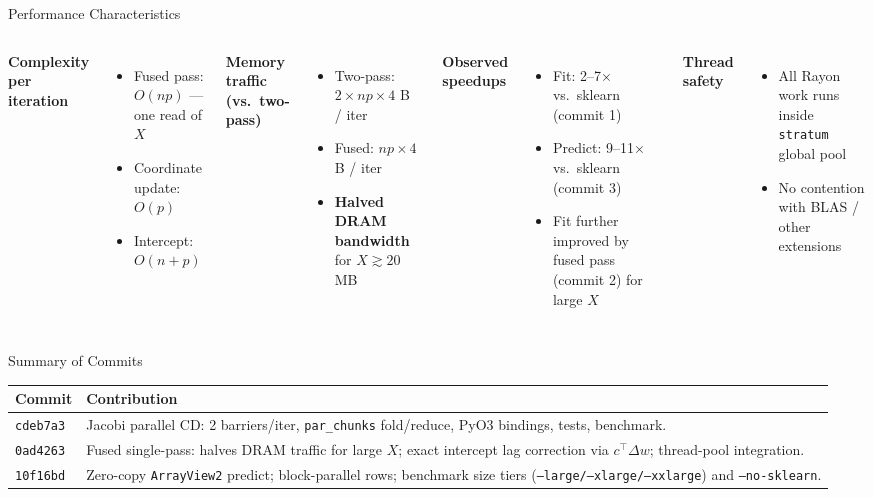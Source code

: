 \documentclass[aspectratio=169]{beamer}
\begin{document}
\begin{frame}{Performance Characteristics}
  \begin{columns}
    \textbf{Complexity per iteration}
    \begin{itemize}
      \item Fused pass: $O(np)$ — one read of $X$
      \item Coordinate update: $O(p)$
      \item Intercept: $O(n + p)$
    \end{itemize}
    \vspace{0.4em}
    \textbf{Memory traffic (vs.\ two-pass)}
    \begin{itemize}
      \item Two-pass: $2 \times np \times 4$ B / iter
      \item Fused: $np \times 4$ B / iter
      \item \textbf{Halved DRAM bandwidth} for $X \gtrsim 20$ MB
    \end{itemize}
    \textbf{Observed speedups}
    \begin{itemize}
      \item Fit: 2--7$\times$ vs.\ sklearn (commit 1)
      \item Predict: 9--11$\times$ vs.\ sklearn (commit 3)
      \item Fit further improved by fused pass (commit 2) for large $X$
    \end{itemize}
    \vspace{0.4em}
    \textbf{Thread safety}
    \begin{itemize}
      \item All Rayon work runs inside \texttt{stratum} global pool
      \item No contention with BLAS / other extensions
    \end{itemize}
  \end{columns}
\end{frame}


\begin{frame}{Summary of Commits}
  \begin{center}
  \begin{tabular}{lp{8.5cm}}
    \hline
    \textbf{Commit} & \textbf{Contribution} \\
    \hline
    \texttt{cdeb7a3} &
      Jacobi parallel CD: 2 barriers/iter, \texttt{par\_chunks} fold/reduce,
      PyO3 bindings, tests, benchmark. \\[4pt]
    \texttt{0ad4263} &
      Fused single-pass: halves DRAM traffic for large $X$; exact intercept
      lag correction via $c^\top \Delta w$; thread-pool integration. \\[4pt]
    \texttt{10f16bd} &
      Zero-copy \texttt{ArrayView2} predict; block-parallel rows; benchmark
      size tiers (\texttt{--large/--xlarge/--xxlarge}) and \texttt{--no-sklearn}. \\
    \hline
  \end{tabular}
  \end{center}
\end{frame}
\end{document}
